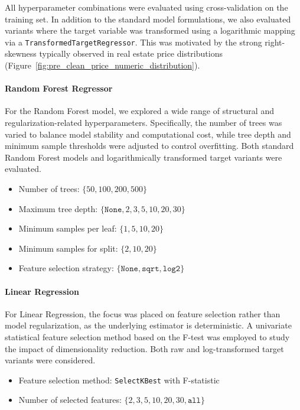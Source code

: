 \documentclass[11pt]{article}
\begin{document}
				\medskip
				\noindent
				All hyperparameter combinations were evaluated using cross-validation on the training set.
				In addition to the standard model formulations, we also evaluated variants where the target variable was transformed using a logarithmic mapping via a \texttt{TransformedTargetRegressor}.
				This was motivated by the strong right-skewness typically observed in real estate price distributions (Figure~\ref{fig:pre_clean_price_numeric_distribution}).

				\paragraph{Random Forest Regressor}
				\noindent
				For the Random Forest model, we explored a wide range of structural and regularization-related hyperparameters.
				Specifically, the number of trees was varied to balance model stability and computational cost, while tree depth and minimum sample thresholds were adjusted to control overfitting.
				Both standard Random Forest models and logarithmically transformed target variants were evaluated.

				\begin{itemize}
					\item Number of trees: $\{50, 100, 200, 500\}$
					\item Maximum tree depth: $\{\texttt{None}, 2, 3, 5, 10, 20, 30\}$
					\item Minimum samples per leaf: $\{1, 5, 10, 20\}$
					\item Minimum samples for split: $\{2, 10, 20\}$
					\item Feature selection strategy: $\{\texttt{None}, \texttt{sqrt}, \texttt{log2}\}$
				\end{itemize}

				\paragraph{Linear Regression}
				\noindent
				For Linear Regression, the focus was placed on feature selection rather than model regularization, as the underlying estimator is deterministic.
				A univariate statistical feature selection method based on the F-test was employed to study the impact of dimensionality reduction.
				Both raw and log-transformed target variants were considered.

				\begin{itemize}
					\item Feature selection method: \texttt{SelectKBest} with F-statistic
					\item Number of selected features: $\{2, 3, 5, 10, 20, 30, \texttt{all}\}$
				\end{itemize}
\end{document}
